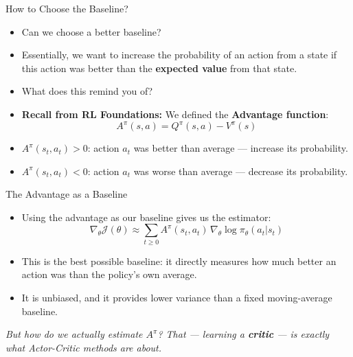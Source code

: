 \begin{frame}{How to Choose the Baseline?}
\begin{itemize}
    \item Can we choose a better baseline?
    \item Essentially, we want to increase the probability of an action from a state if this action was better than the \textbf{expected value} from that state.
    \pause
    \item What does this remind you of?
    \pause
    \item \textbf{Recall from RL Foundations:} We defined the \textbf{Advantage function}:
    $$A^{\pi}(s,a) = Q^{\pi}(s,a) - V^{\pi}(s)$$
    \item $A^{\pi}(s_t, a_t) > 0$: action $a_t$ was better than average --- increase its probability.
    \item $A^{\pi}(s_t, a_t) < 0$: action $a_t$ was worse than average --- decrease its probability.
\end{itemize}
\end{frame}

\begin{frame}{The Advantage as a Baseline}
\begin{itemize}
    \item Using the advantage as our baseline gives us the estimator:
    $$\nabla_\theta \mathcal{J}(\theta) \approx \sum_{t \geq 0} A^{\pi}(s_t, a_t) \, \nabla_\theta \log \pi_\theta (a_t|s_t) $$
    \item This is the best possible baseline: it directly measures how much better an action was than the policy's own average.
    \item It is unbiased, and it provides lower variance than a fixed moving-average baseline.
\end{itemize}
\vspace{0.5em}
\textit{But how do we actually estimate $A^{\pi}$? That --- learning a \textbf{critic} --- is exactly what Actor-Critic methods are about.}
\end{frame}


